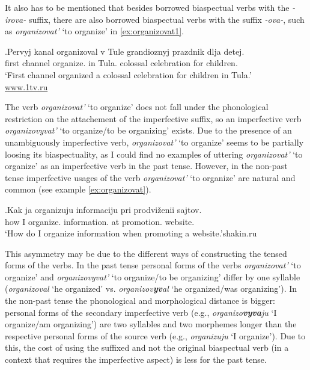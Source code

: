 It also has to be mentioned that besides borrowed biaspectual verbs with the \textit{-irova-} suffix, there are also borrowed biaspectual verbs with the suffix \textit{-ova-}, such as \textit{organizovat'} `to organize' in \ref{ex:organizovat1}. 

\exg.\label{ex:organizovat1}Pervyj kanal organizoval\textsuperscript{\PF} v Tule grandioznyj prazdnik dlja detej.\\
first channel organize. in Tula. colossal celebration for children.\\
\trans `First channel organized a colossal celebration for children in Tula.'\\\hbox{}\hfill\hbox{\url{www.1tv.ru}}

The verb \textit{organizovat'} `to organize' does not fall under the phonological restriction on the attachement of the imperfective suffix, so an imperfective verb \textit{organizovyvat'}\textsuperscript{\IPF} `to organize/to be organizing' exists. Due to the presence of an unambiguously imperfective verb, \textit{organizovat'} `to organize' seems to be partially loosing its biaspectuality, as I could find no examples of uttering \textit{organizovat'} `to organize' as an imperfective verb in the past tense. However, in the non-past tense imperfective usages of the verb \textit{organizovat'} `to organize' are natural and common (see example \ref{ex:organizovat}).

\exg.\label{ex:organizovat}Kak ja organizuju\textsuperscript{\IPF} informaciju pri prodvi\v{z}enii sajtov.\\
how I organize. information. at promotion. website.\\
\trans `How do I organize information when promoting a website.'\hbox{}\hfill\hbox{shakin.ru}

This asymmetry may be due to the different ways of constructing the tensed forms of the verbs. In the past tense personal forms of the verbs \textit{organizovat'} `to organize' and \textit{organizovyvat'}\textsuperscript{\IPF} `to organize/to be organizing' differ by one syllable (\textit{organizoval} `he organized' vs. \textit{organizov\textbf{yv}al} `he organized/was organizing'). In the non-past tense the phonological and morphological distance is bigger: personal forms of the secondary imperfective verb (e.g., \textit{organizo\textbf{vyva}ju} `I organize/am organizing') are two syllables and two morphemes longer than the respective personal forms of the source verb (e.g., \textit{organizuju} `I organize'). Due to this, the cost of using the suffixed and not the original biaspectual verb (in a context that requires the imperfective aspect) is less for the past tense.

